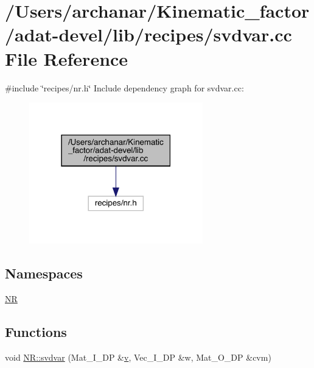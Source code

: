 \hypertarget{adat-devel_2lib_2recipes_2svdvar_8cc}{}\section{/\+Users/archanar/\+Kinematic\+\_\+factor/adat-\/devel/lib/recipes/svdvar.cc File Reference}
\label{adat-devel_2lib_2recipes_2svdvar_8cc}
{\ttfamily \#include \char`\"{}recipes/nr.\+h\char`\"{}}\newline
Include dependency graph for svdvar.\+cc\+:
\nopagebreak
\begin{figure}[H]
\begin{center}
\leavevmode
\includegraphics[width=214pt]{d6/d13/adat-devel_2lib_2recipes_2svdvar_8cc__incl}
\end{center}
\end{figure}
\subsection*{Namespaces}
\begin{DoxyCompactItemize}
\item 
 \mbox{\hyperlink{namespaceNR}{NR}}
\end{DoxyCompactItemize}
\subsection*{Functions}
\begin{DoxyCompactItemize}
\item 
void \mbox{\hyperlink{namespaceNR_a7718198c5af1e10344d7c8933fe579c5}{N\+R\+::svdvar}} (Mat\+\_\+\+I\+\_\+\+DP \&\mbox{\hyperlink{adat__devel_2lib_2hadron_2hadron__timeslice_8cc_a716fc87f5e814be3ceee2405ed6ff22a}{v}}, Vec\+\_\+\+I\+\_\+\+DP \&w, Mat\+\_\+\+O\+\_\+\+DP \&cvm)
\end{DoxyCompactItemize}
